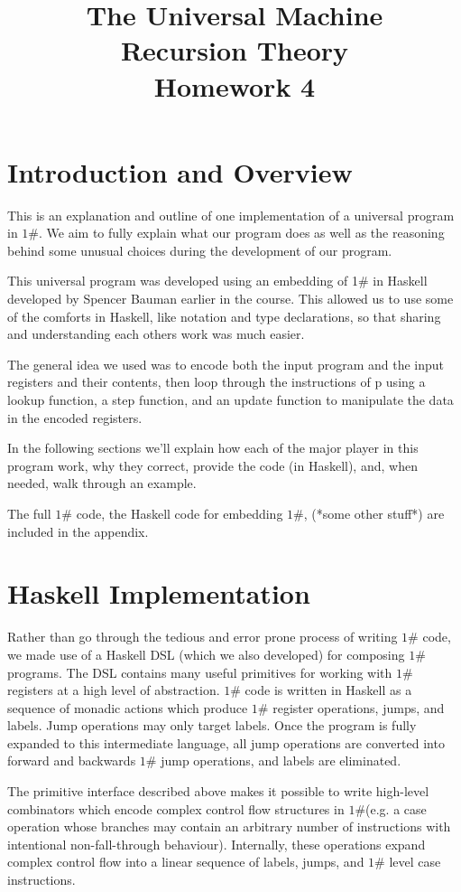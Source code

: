 \documentclass[10pt, preprint, nocopyrightspace]{sigplanconf}
\title{The Universal \oh Machine\\\large Recursion Theory\\ Homework 4}
\newcommand{\oh}{$1\#$\xspace}
\begin{document}
\maketitle

\section{Introduction and Overview}

This is an explanation and outline of one implementation of a universal program
in \oh. We aim to fully explain what our program does as well as the reasoning
behind some unusual choices during the development of our program. 

This universal program was developed using an embedding of 1# in Haskell
developed by Spencer Bauman earlier in the course. This allowed us to use some
of the comforts in Haskell, like notation and type declarations, so that
sharing and understanding each others work was much easier. 

The general idea we used was to encode both the input program and the input
registers and their contents, then loop through the instructions of p using a
lookup function, a step function, and an update function to manipulate the data
in the encoded registers. 

In the following sections we’ll explain how each of the major player in this
program work, why they correct, provide the code (in Haskell), and, when
needed, walk through an example. 

The full \oh code, the Haskell code for embedding \oh, (*some other stuff*) are
included in the appendix. 

\section{Haskell Implementation}

Rather than go through the tedious and error prone process of writing \oh code,
we made use of a Haskell DSL (which we also developed) for composing \oh
programs.
The DSL contains many useful primitives for working with \oh registers at a high
level of abstraction.
\oh code is written in Haskell as a sequence of monadic actions which produce
\oh register operations, jumps, and labels.
Jump operations may only target labels.
Once the program is fully expanded to this intermediate language, all jump
operations are converted into forward and backwards \oh jump operations, and
labels are eliminated.

The primitive interface described above makes it possible to write high-level
combinators which encode complex control flow structures in \oh (e.g. a case
operation whose branches may contain an arbitrary number of instructions with
intentional non-fall-through behaviour).
Internally, these operations expand complex control flow into a linear sequence
of labels, jumps, and \oh level case instructions.
\end{document}
